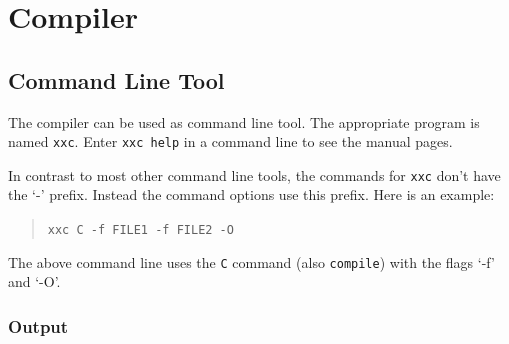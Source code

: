 \documentclass{report}
\def\xxc{\texttt{xxc}\xspace}
\begin{document}

\chapter{Compiler}



\section{Command Line Tool}

The compiler can be used as command line tool. The appropriate program is named \xxc.
Enter \texttt{xxc help} in a command line to see the manual pages.

In contrast to most other command line tools, the commands for \xxc don't have the `-' prefix.
Instead the command options use this prefix. Here is an example:
\begin{quote}
\texttt{xxc C -f FILE1 -f FILE2 -O}
\end{quote}
The above command line uses the \texttt{C} command (also \texttt{compile}) with the flags `-f' and `-O'.

\subsection{Output}
\end{document}
